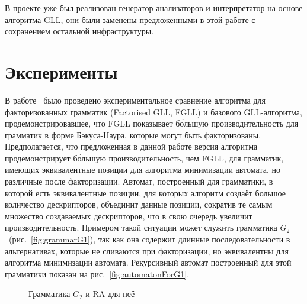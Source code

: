 \documentclass[12pt]{matmex-diploma-custom}
\begin{document}
    В проекте уже был реализован генератор анализаторов и интерпретатор
    на основе алгоритма GLL, они были заменены предложенными в этой работе с сохранением остальной инфраструктуры.

	\section{Эксперименты}
    В работе~\cite{scott2016structuring}
    было проведено экспериментальное сравнение алгоритма для факторизованных грамматик (Factorised GLL, FGLL) и базового GLL-алгоритма,
    продемонстрировавшее, что FGLL показывает б\`ольшую производительность для грамматик в форме Бэкуса-Наура, которые могут быть факторизованы.
    Предполагается, что предложенная в данной работе версия алгоритма
    продемонстрирует б\`ольшую производительность, чем FGLL, для грамматик, имеющих эквивалентные позиции для алгоритма минимизации автомата, но различные после факторизации. Автомат, построенный для грамматики, в которой есть эквивалентные позиции, для которых алгоритм создаёт большое количество дескрипторов,
    объединит данные позиции, сократив те самым множество создаваемых дескрипторов,
    что в свою очередь увеличит производительность. Примером такой ситуации может служить грамматика 
    $G_2$~(рис.~\ref{fig:grammarG1}), так как она содержит длинные последовательности 
    в альтернативах, которые не сливаются при факторизации, но эквивалентны для алгоритма минимизации автомата.
    Рекурсивный автомат построенный для этой грамматики показан на рис.~\ref{fig:automatonForG1}.
    
    \begin{figure}[ht]   
        \centering
        
        \caption{Грамматика $G_2$ и RA для неё}
    \end{figure}
    
\end{document}
